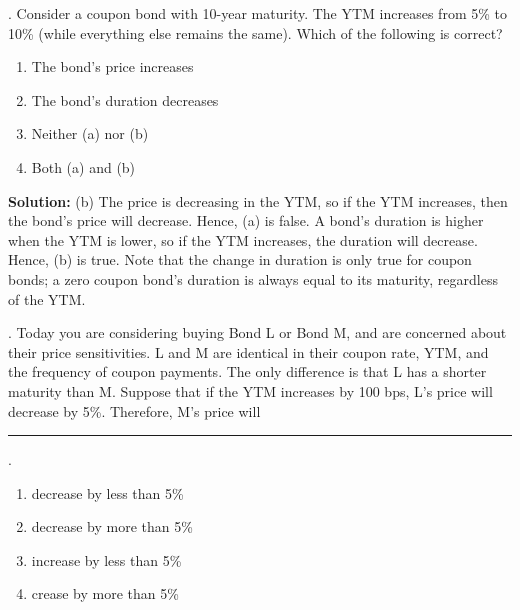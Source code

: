 \documentclass[11.5pt]{article}
\begin{document}
\vspace{30pt}




. Consider a coupon bond with 10-year maturity. The YTM increases from 5\% to 10\% (while everything else remains the same). Which of the following is correct?


\begin{enumerate}[a]
	
	\item The bond’s price increases
	
	\item The bond’s duration decreases
	
	\item Neither (a) nor (b)
	
	\item Both (a) and (b)
\end{enumerate}


\noindent \textbf{Solution:} (b) The price is decreasing in the YTM, so if the YTM increases, then the bond’s price will decrease. Hence, (a) is false. A bond’s duration is higher when the YTM is lower, so if the YTM increases, the duration will decrease. Hence, (b) is true. Note that the change in duration is only true for coupon bonds; a zero coupon bond’s duration is always equal to its maturity, regardless of the YTM.

\vspace{30pt}


\newpage


. Today you are considering buying Bond L or Bond M, and are concerned about their price sensitivities. L and M are identical in their coupon rate, YTM, and the frequency of coupon payments. The only difference is that L has a shorter maturity than M. Suppose that if the YTM increases by 100 bps, L’s price will decrease by 5\%. Therefore, M’s price will \rule{1cm}{0.15mm}.


\begin{enumerate}[a]
	
	\item decrease by less than 5\%
	
	\item decrease by more than 5\%
	
	\item increase by less than 5\%
	
	\item crease by more than 5\%
\end{enumerate}
\end{document}
